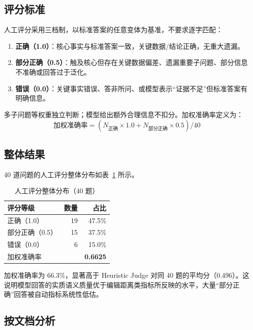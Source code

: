 \subsection{评分标准}

人工评分采用三档制，以标准答案的任意变体为基准，不要求逐字匹配：

\begin{enumerate}[label=（\arabic*）]
\item \textbf{正确（1.0）}：核心事实与标准答案一致，关键数据/结论正确，无重大遗漏。
\item \textbf{部分正确（0.5）}：触及核心但存在关键数据偏差、遗漏重要子问题、部分信息不准确或回答过于泛化。
\item \textbf{错误（0.0）}：关键事实错误、答非所问、或模型表示``证据不足''但标准答案有明确信息。
\end{enumerate}

多子问题等权重独立判断；模型给出额外合理信息不扣分。加权准确率定义为： $$\text{加权准确率} = (N_{\text{正确}} \times 1.0 + N_{\text{部分正确}} \times 0.5) / 40$$

\subsection{整体结果}

40 道问题的人工评分整体分布如表~\ref{tab:human-eval-overall} 所示。

\begin{table}[htbp]
\centering
\caption{人工评分整体分布（40 题）}
\label{tab:human-eval-overall}
\begin{tabular}{@{}lrr@{}}
\toprule
\textbf{评分等级} & \textbf{数量} & \textbf{占比} \\
\midrule
正确（1.0）& 19 & 47.5\% \\
部分正确（0.5）& 15 & 37.5\% \\
错误（0.0）& 6 & 15.0\% \\
\midrule
加权准确率 & & \textbf{0.6625} \\
\bottomrule
\end{tabular}
\end{table}

加权准确率为 66.3\%，显著高于 Heuristic Judge 对同 40 题的平均分（0.496）。这说明模型回答的实质语义质量优于编辑距离类指标所反映的水平，大量``部分正确''回答被自动指标系统性低估。

\subsection{按文档分析}

